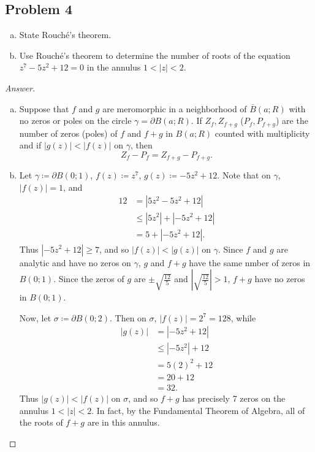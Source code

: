 \documentclass[12pt]{article}
\newcommand{\abs}[1]{\left| #1 \right|}
\theoremstyle{definition}
\begin{document}
\subsection{Problem 4 \texorpdfstring{\cite{Lin}}{}}
\begin{enumerate}[(a)]
    \item State Rouch\'e's theorem.
    \item Use Rouch\'e's theorem to determine the number of roots of the equation $z^7 - 5z^2 + 12 = 0$ in the annulus $1 < |z| < 2$.
\end{enumerate}
\begin{proof}[Answer]
    \noindent
    \begin{enumerate}[(a)]
        \item Suppose that $f$ and $g$ are meromorphic in a neighborhood of $\bar{B}(a;R)$ with no zeros or poles on the circle $\gamma = \partial B(a;R)$. If $Z_f,Z_{f+g}$ ($P_f,P_{f+g}$) are the number of zeros (poles) of $f$ and $f+g$ in $B(a;R)$ counted with multiplicity and if $|g(z)| < |f(z)|$ on $\gamma$, then 
        \[
            Z_f - P_f = Z_{f+g} - P_{f+g}.
        \]
        \item Let $\gamma \coloneqq \partial B(0;1)$, $f(z) \coloneqq z^7$, $g(z) \coloneqq -5z^2 + 12$. Note that on $\gamma$, $|f(z)| = 1$, and 
        \begin{align*}
            12 & = \abs{ 5z^2 - 5z^2 + 12 } \\
            & \leq \abs{ 5z^2 } + \abs{ -5z^2 + 12 } \\
            & = 5 + \abs{ -5z^2 + 12 }.
        \end{align*}
        Thus $\abs{ -5z^2 + 12 } \geq 7$, and so $|f(z)| < |g(z)|$ on $\gamma$. Since $f$ and $g$ are analytic and have no zeros on $\gamma$, $g$ and $f + g$ have the same nmber of zeros in $B(0;1)$. Since the zeros of $g$ are $\pm \sqrt{ \frac{12}{5} }$ and $\abs{ \sqrt{ \frac{12}{5} } } > 1$, $f + g$ have no zeros in $B(0;1)$. 
        
        Now, let $\sigma \coloneqq \partial B(0;2)$. Then on $\sigma$, $\abs{ f(z) } = 2^7 = 128$, while 
        \begin{align*}
            \abs{ g(z) } & = \abs{ -5z^2 + 12 } \\
            & \leq \abs{ -5z^2 } + 12 \\
            & = 5(2)^2 + 12 \\
            & = 20 + 12 \\
            & = 32.
        \end{align*}
        Thus $\abs{ g(z) } < \abs{ f(z) }$ on $\sigma$, and so $f+g$ has precisely 7 zeros on the annulus $1 < |z| < 2$. In fact, by the Fundamental Theorem of Algebra, all of the roots of $f + g$ are in this annulus.
    \end{enumerate}
\end{proof}
\end{document}
